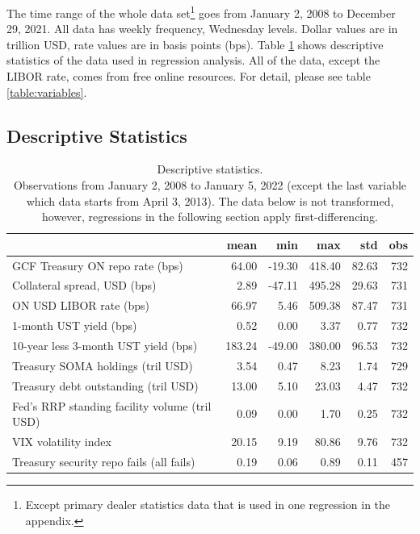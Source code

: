 \documentclass[11pt,a4paper,english,oneside]{article}
\begin{document}
The time range of the whole data set\footnote{Except primary dealer statistics data that is used in one regression in the appendix.} goes from January 2, 2008 to December 29, 2021. All data has weekly frequency, Wednesday levels. Dollar values are in trillion USD, rate values are in basis points (bps). Table \ref{table:stats} shows descriptive statistics of the data used in regression analysis. All of the data, except the LIBOR rate, comes from free online resources. For detail, please see table \ref{table:variables}.


\subsection{Descriptive Statistics}

\lipsum[1-3]




\begin{table}[!h] \centering
\begin{threeparttable}
\caption{Descriptive statistics.\\Observations from January 2, 2008 to January 5, 2022 (except the last variable which data starts from April 3, 2013). The data below is not transformed, however, regressions in the following section apply first-differencing.}
\begin{tabular}{lrrrrr}
\toprule
{} &    mean &    min &     max &    std &  obs \\
\midrule
  GCF Treasury ON repo rate (bps)      &   64.00 & -19.30 &  418.40 &  82.63 &  732 \\
Collateral spread, USD (bps) &    2.89 & -47.11 &  495.28 &  29.63 &  731 \\
ON USD LIBOR rate (bps)             &   66.97 &   5.46 &  509.38 &  87.47 &  731 \\
1-month UST yield (bps)           &    0.52 &   0.00 &    3.37 &   0.77 &  732 \\
10-year less 3-month UST yield (bps)       &  183.24 & -49.00 &  380.00 &  96.53 &  732 \\
  Treasury SOMA holdings (tril USD)     &    3.54 &   0.47 &    8.23 &   1.74 &  729 \\
  Treasury debt outstanding (tril USD)              &   13.00 &   5.10 &   23.03 &   4.47 &  732 \\
  Fed's RRP standing facility volume (tril USD)               &    0.09 &   0.00 &    1.70 &   0.25 &  732 \\
VIX volatility index              &   20.15 &   9.19 &   80.86 &   9.76 &  732 \\
  Treasury security repo fails (all fails)          &    0.19 &   0.06 &    0.89 &   0.11 &  457 \\
\bottomrule
\end{tabular}
\label{table:stats}
\end{threeparttable}
\end{table}
\end{document}
